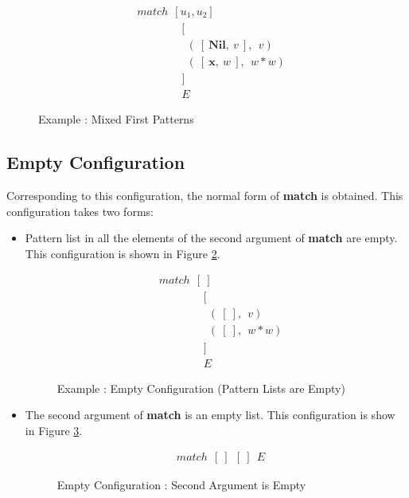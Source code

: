 \documentclass[11pt]{article}
\begin{document}
    \begin{figure}[!h]
    \begin{align*} 
    &match~~[u_1,u_2] \\
    &\qquad\qquad [\\
    &\qquad\qquad ~~(~[~\mathbf{Nil},~v~],~~v) \\
    &\qquad\qquad ~~(~[~\mathbf{x},~w~],~~w*w) \\
    &\qquad\qquad ]\\
    &\qquad\qquad E
    \end{align*} 
    \caption{Example : Mixed First Patterns} \label{fig:Pmatch_MixedPatt}
    \end{figure}

\subsection{Empty Configuration}
Corresponding to this configuration, the normal form of {\bf match} is obtained. This configuration takes two forms:
\begin{itemize}
  \item Pattern list in all the elements of the second argument of {\bf match} are empty. This configuration is shown in Figure \ref {fig:Pmatch_EmptyPatt}.
    \begin{figure}[!h]
    \begin{align*} 
    &match~~[~] \\
    &\qquad\qquad [\\
    &\qquad\qquad ~~(~[~],~~v) \\
    &\qquad\qquad ~~(~[~],~~w*w) \\
    &\qquad\qquad ]\\
    &\qquad\qquad E
    \end{align*} 
    \caption{Example : Empty Configuration (Pattern Lists are Empty)} \label{fig:Pmatch_EmptyPatt}
    \end{figure}
  \item The second argument of {\bf match} is an empty list. This configuration is show in Figure \ref {fig:Pmatch_EmptySArgs}.
    \begin{figure}[!h]
    \begin{align*} 
    &match~~[~]~~[~]~~E 
    \end{align*} 
    \caption{Empty Configuration : Second Argument is Empty} \label{fig:Pmatch_EmptySArgs}
    \end{figure}
\end{itemize}
\end{document}
